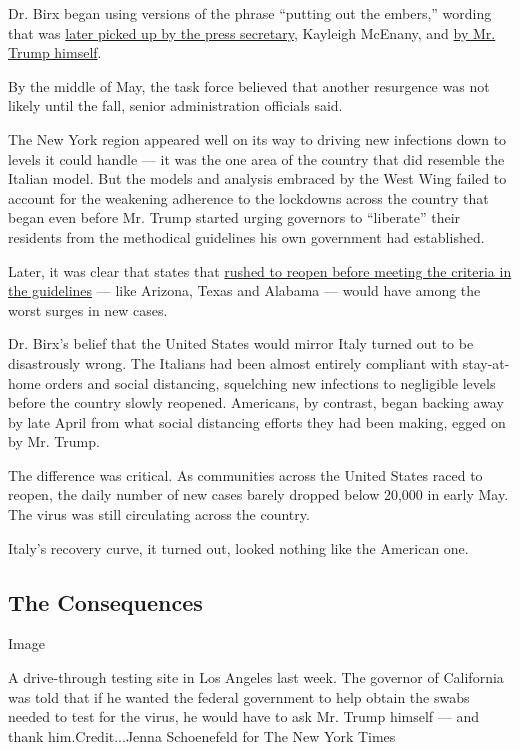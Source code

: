 Dr. Birx began using versions of the phrase ``putting out the embers,''
wording that was
\href{https://www.whitehouse.gov/briefings-statements/press-briefing-press-secretary-kayleigh-mcenany-062220/}{later
picked up by the press secretary}, Kayleigh McEnany, and
\href{https://twitter.com/realDonaldTrump/status/1276363261957603328?s=20}{by
Mr. Trump himself}.

By the middle of May, the task force believed that another resurgence
was not likely until the fall, senior administration officials said.

The New York region appeared well on its way to driving new infections
down to levels it could handle --- it was the one area of the country
that did resemble the Italian model. But the models and analysis
embraced by the West Wing failed to account for the weakening adherence
to the lockdowns across the country that began even before Mr. Trump
started urging governors to ``liberate'' their residents from the
methodical guidelines his own government had established.

Later, it was clear that states that
\href{https://www.nytimes3xbfgragh.onion/interactive/2020/05/07/us/coronavirus-states-reopen-criteria.html}{rushed
to reopen before meeting the criteria in the guidelines} --- like
Arizona, Texas and Alabama --- would have among the worst surges in new
cases.

Dr. Birx's belief that the United States would mirror Italy turned out
to be disastrously wrong. The Italians had been almost entirely
compliant with stay-at-home orders and social distancing, squelching new
infections to negligible levels before the country slowly reopened.
Americans, by contrast, began backing away by late April from what
social distancing efforts they had been making, egged on by Mr. Trump.

The difference was critical. As communities across the United States
raced to reopen, the daily number of new cases barely dropped below
20,000 in early May. The virus was still circulating across the country.

Italy's recovery curve, it turned out, looked nothing like the American
one.

\hypertarget{the-consequences}{%
\subsection{The Consequences}\label{the-consequences}}

Image

A drive-through testing site in Los Angeles last week. The governor of
California was told that if he wanted the federal government to help
obtain the swabs needed to test for the virus, he would have to ask Mr.
Trump himself --- and thank him.Credit...Jenna Schoenefeld for The New
York Times

